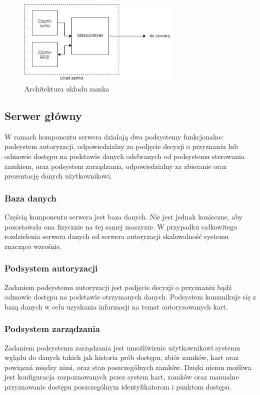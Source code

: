                         \begin{figure}
                                \centering
                                \includegraphics[width=0.7\textwidth]{chapters/images/lock.png}
                                \caption{Architektura układu zamka}
                                \label{fig:lock-arch}
                        \end{figure}

                \subsection{Serwer główny}
                        W ramach komponentu serwera działają dwa podsystemy funkcjonalne: podsystem autoryzacji, odpowiedzialny za podjęcie decyzji o przyznaniu lub odmowie dostępu na podstawie danych odebranych od podsystemu sterowania zamkiem, oraz podsystem zarządzania, odpowiedzialny za zbieranie oraz prezentację danych użytkownikowi.

                \subsubsection{Baza danych}
                        Częścią komponentu serwera jest baza danych. Nie jest jednak konieczne, aby pozostawała ona fizycznie na tej samej maszynie. W przypadku całkowitego rozdzielenia serwera danych od serwera autoryzacji skalowalność systemu znacząco wzrośnie.

                \subsubsection{Podsystem autoryzacji}
                        Zadaniem podsystemu autoryzacji jest podjęcie decyzji o przyznaniu bądź odmowie dostępu na podstawie otrzymanych danych. Podsystem komunikuje się z bazą danych w celu uzyskania informacji na temat autoryzowanych kart.

                \subsubsection{Podsystem zarządzania}
                        Zadaniem podsystemu zarządzania jest umożliwienie użytkownikowi systemu wglądu do danych takich jak historia prób dostępu, zbiór zamków, kart oraz powiązań między nimi, oraz stan poszczególnych zamków. Dzięki niemu możliwa jest konfiguracja rozpoznawanych przez system kart, zamków oraz manualne przyznawanie dostępu poszczególnym identyfikatorom i punktom dostępu.

